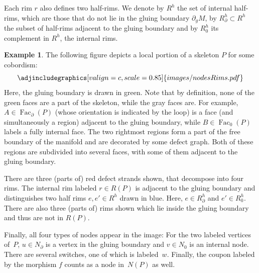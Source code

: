 \documentclass[pdftex]{sigma}
\DeclareMathOperator{\Fac}{\mathrm{Fac}}
\numberwithin{equation}{section}
\theoremstyle{definition}
\newtheorem{Example}[Example]{Example}
\begin{document}
Each rim $r$ also defines two half-rims. We denote by $R^h$ the set of internal half-rims, which are those that do not lie in the gluing boundary $\partial_gM$, by $R_{\partial}^h \subset R^h$ the subset of half-rims adjacent to the gluing boundary and by $R_0^h$ its complement in $R^h$, the internal rims.

\begin{Example}
 The following figure depicts a local portion of a skeleton $P$ for some cobordism:
$$
 \adjincludegraphics[valign=c, scale = 0.85]{images/nodesRims.pdf}
$$
 Here, the gluing boundary is drawn in green. Note that by definition, none of the green faces are a part of the skeleton, while the gray faces are. For example, $A \in \Fac_{\partial}(P)$ (whose orientation is indicated by the loop) is a face (and simultaneously a region) adjacent to the gluing boundary, while $B \in \Fac_0(P)$ labels a fully internal face. The two rightmost regions form a part of the free boundary of the manifold and are decorated by some defect graph. Both of these regions are subdivided into several faces, with some of them adjacent to the gluing boundary.

 There are three (parts of) red defect strands shown, that decompose into four rims. The internal rim labeled $r \in R(P)$ is adjacent to the gluing boundary and distinguishes two half rims $e, e' \in R^h$ drawn in blue. Here, $e \in R_{\partial}^h$ and $e' \in R_0^h$. There are also three (parts of) rims shown which lie inside the gluing boundary and thus are not in $R(P)$.

 Finally, all four types of nodes appear in the image: For the two labeled vertices of~$P$, $u \in N_{\partial}$ is a vertex in the gluing boundary and $v \in N_0$ is an internal node. There are several switches, one of which is labeled~$w$. Finally, the coupon labeled by the morphism $f$ counts as a node in~$N(P)$ as well.
\end{Example}
\end{document}
